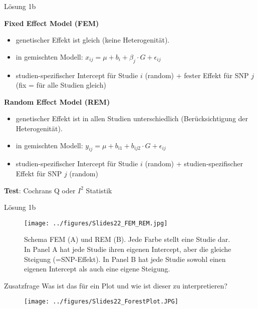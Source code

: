 \documentclass{beamer}
\begin{document}
\begin{frame}{Lösung 1b}

    \textbf{Fixed Effect Model (FEM)}

    \begin{itemize}
        \item genetischer Effekt ist gleich (keine Heterogenität). 
        \item in gemischten Modell: $x_{ij} = \mu + b_i + \beta_j \cdot G + \epsilon_{ij}$
        \item studien-spezifischer Intercept für Studie $i$ (random) + fester Effekt für SNP $j$  (fix = für alle Studien gleich)  
    \end{itemize}

    \textbf{Random Effect Model (REM)}

    \begin{itemize}
        \item genetischer Effekt ist in allen Studien unterschiedlich (Berücksichtigung der Heterogenität). 
        \item in gemischten Modell: $y_{ij} = \mu + b_{i1} + b_{ij2} \cdot G + \epsilon_{ij}$
        \item studien-spezifischer Intercept für Studie $i$ (random) + studien-spezifischer Effekt für SNP $j$ (random) 
    \end{itemize}

    \textbf{Test}: Cochrans Q oder $I^2$ Statistik
    
\end{frame}

\begin{frame}{Lösung 1b}
\begin{figure}[h]
\begin{center}
\texttt{[image: ../figures/Slides22\_FEM\_REM.jpg]}
\caption{Schema FEM (A) und REM (B). Jede Farbe stellt eine Studie dar. In Panel A hat jede Studie ihren eigenen Intercept, aber die gleiche Steigung (=SNP-Effekt). In Panel B hat jede Studie sowohl einen eigenen Intercept als auch eine eigene Steigung.}
\label{fig:FEM_REM}
\end{center}
\end{figure}
\end{frame}

\begin{frame}{Zusatzfrage}
    Was ist das für ein Plot und wie ist dieser zu interpretieren? 

\begin{figure}[h]
\begin{center}
\texttt{[image: ../figures/Slides22\_ForestPlot.JPG]}
\label{fig:Forestplot}
\end{center}
\end{figure}
    
\end{frame}
\end{document}
